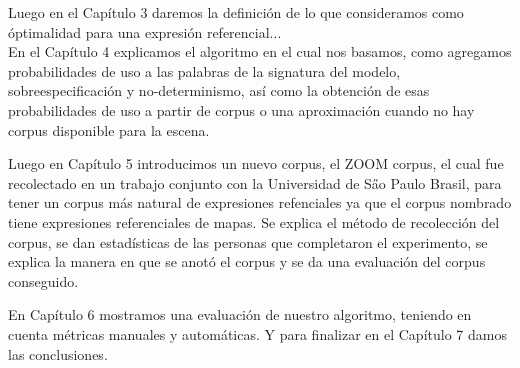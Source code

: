 Luego en el Cap\'itulo 3 daremos la definici\'on de lo que consideramos como \'optimalidad para una expresi\'on referencial...\\

En el Cap\'itulo 4 explicamos el algoritmo en el cual nos basamos, como agregamos probabilidades de uso a las palabras de la signatura del modelo, sobreespecificaci\'on y no-determinismo, as\'i como la obtenci\'on de esas probabilidades de uso a partir de corpus o una aproximaci\'on cuando no hay corpus disponible para la escena.

Luego en Cap\'itulo 5 introducimos un nuevo corpus, el ZOOM corpus, el cual fue recolectado en un trabajo conjunto con la Universidad de S\H ao Paulo Brasil, para tener un corpus m\'as natural de expresiones refenciales ya que el corpus nombrado tiene expresiones referenciales de mapas. Se explica el m\'etodo de recolecci\'on del corpus, se dan estad\'isticas de las personas que completaron el experimento, se explica la manera en que se anot\'o el corpus y se da una evaluaci\'on del corpus conseguido.

En Cap\'itulo 6 mostramos una evaluaci\'on de nuestro algoritmo, teniendo en cuenta m\'etricas manuales y autom\'aticas. Y para finalizar en el Cap\'itulo 7 damos las conclusiones.
